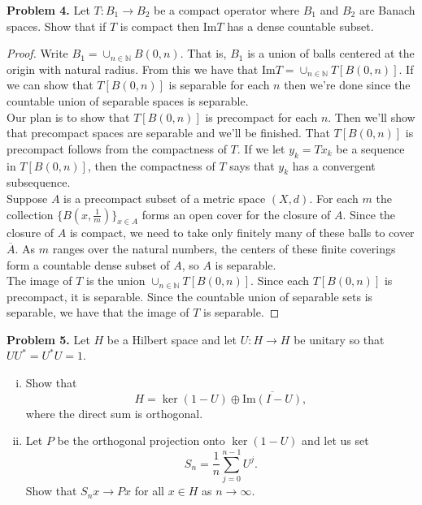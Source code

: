 \documentclass[11pt,letterpaper]{report}
\newcommand{\naturals}{\mathbb{N}}
\newcommand{\im}[1]{\text{Im}\left({#1}\right)}
\begin{document}
\noindent\textbf{Problem 4. }Let $T:B_1\to B_2$ be a compact operator where $B_1$ and $B_2$ are Banach spaces. Show that if $T$ is compact then Im$T$ has a dense countable subset.
\begin{proof}
	Write $B_1 = \cup_{n\in \naturals}B(0, n)$. That is, $B_1$ is a union of balls centered at the origin with natural radius. From this we have that Im$T = \cup_{n\in \naturals}T[B(0,n)]$. If we can show that $T[B(0,n)]$ is separable for each $n$ then we're done since the countable union of separable spaces is separable.\\

	\noindent Our plan is to show that $T[B(0,n)]$ is precompact for each $n$. Then we'll show that precompact spaces are separable and we'll be finished. That $T[B(0,n)]$ is precompact follows from the compactness of $T$. If we let $y_k = Tx_k$ be a sequence in $T[B(0,n)]$, then the compactness of $T$ says that $y_k$ has a convergent subsequence.\\

	\noindent Suppose $A$ is a precompact subset of a metric space $(X, d)$. For each $m$ the collection $\{B(x, \frac{1}{m})\}_{x\in A}$ forms an open cover for the closure of $A$. Since the closure of $A$ is compact, we need to take only finitely many of these balls to cover $\overline{A}$. As $m$ ranges over the natural numbers, the centers of these finite coverings form a countable dense subset of $A$, so $A$ is separable.\\

	\noindent The image of $T$ is the union $\cup_{n\in \naturals}T[B(0,n)]$. Since each $T[B(0,n)]$ is precompact, it is separable. Since the countable union of separable sets is separable, we have that the image of $T$ is separable.
\end{proof}

\noindent\textbf{Problem 5. }Let $H$ be a Hilbert space and let $U: H\to H$ be unitary so that $UU^* = U^*U = 1$.
\begin{enumerate}[(i)]
	\item Show that
	\[
	H = \ker(1-U)\oplus\overline{\im{I-U}},
	\]
	where the direct sum is orthogonal.

	\item Let $P$ be the orthogonal projection onto $\ker(1-U)$ and let us set
	\[
	S_n = \frac{1}{n}\sum_{j=0}^{n-1}U^j.
	\]
	Show that $S_nx\to Px$ for all $x\in H$ as $n\to \infty$.
\end{enumerate}
\end{document}
